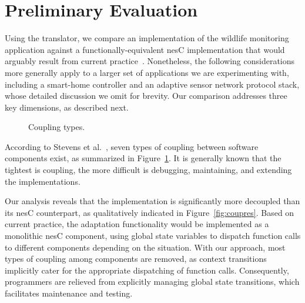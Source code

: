 \section{Preliminary Evaluation}
\label{sec:eval}

Using the translator, we compare an implementation of the wildlife
monitoring application against a functionally-equivalent nesC
implementation that would arguably result from current
practice~\cite{mottola10:survey,Picco:2010:SEW:1882362.1882421,pasztor10:selective}. Nonetheless,
the following considerations more generally apply to a larger set of
applications we are experimenting with, including a smart-home
controller and an adaptive sensor network protocol stack, whose
detailed discussion we omit for brevity. Our comparison addresses
three key dimensions, as described next.


\begin{figure}[!tb]
\renewcommand{\arraystretch}{1.1}
\scriptsize
\centering

\vspace{-2mm}
\caption{Coupling types.}
\label{tab:couptypes}
\vspace{-7mm}
\end{figure}

 According to Stevens et
al.~\cite{Stevens79}, seven types of coupling between software components
exist, as summarized in Figure~\ref{tab:couptypes}. It is generally
known that the tightest is coupling, the more difficult is debugging,
maintaining, and extending the implementations.

Our analysis reveals that the \conesc implementation is significantly
more decoupled than its nesC counterpart, as qualitatively indicated
in Figure~\ref{fig:coupres}. Based on current practice, the adaptation
functionality would be implemented as a monolithic nesC component,
using global state variables to dispatch function calls to different
components depending on the situation. With our approach, most
types of coupling among components are removed, as context transitions
implicitly cater for the appropriate dispatching of function
calls. Consequently, programmers are relieved from explicitly managing
global state transitions, which facilitates maintenance and testing.


